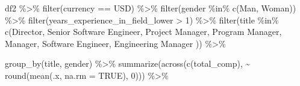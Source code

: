\documentclass[
]{article}
\newenvironment{Shaded}{\begin{snugshade}}{\end{snugshade}}
\newcommand{\AttributeTok}[1]{\textcolor[rgb]{0.77,0.63,0.00}{#1}}
\newcommand{\ConstantTok}[1]{\textcolor[rgb]{0.00,0.00,0.00}{#1}}
\newcommand{\DecValTok}[1]{\textcolor[rgb]{0.00,0.00,0.81}{#1}}
\newcommand{\FunctionTok}[1]{\textcolor[rgb]{0.00,0.00,0.00}{#1}}
\newcommand{\NormalTok}[1]{#1}
\newcommand{\SpecialCharTok}[1]{\textcolor[rgb]{0.00,0.00,0.00}{#1}}
\newcommand{\StringTok}[1]{\textcolor[rgb]{0.31,0.60,0.02}{#1}}
\begin{document}
\begin{Shaded}
\begin{Highlighting}[]
\NormalTok{df2 }\SpecialCharTok{\%\textgreater{}\%}
    \FunctionTok{filter}\NormalTok{(currency }\SpecialCharTok{==} \StringTok{\textquotesingle{}USD\textquotesingle{}}\NormalTok{) }\SpecialCharTok{\%\textgreater{}\%}
    \FunctionTok{filter}\NormalTok{(gender }\SpecialCharTok{\%in\%} \FunctionTok{c}\NormalTok{(}\StringTok{\textquotesingle{}Man\textquotesingle{}}\NormalTok{, }\StringTok{\textquotesingle{}Woman\textquotesingle{}}\NormalTok{)) }\SpecialCharTok{\%\textgreater{}\%}
    \FunctionTok{filter}\NormalTok{(years\_experience\_in\_field\_lower }\SpecialCharTok{\textgreater{}} \DecValTok{1}\NormalTok{) }\SpecialCharTok{\%\textgreater{}\%}
    \FunctionTok{filter}\NormalTok{(title }\SpecialCharTok{\%in\%} \FunctionTok{c}\NormalTok{(}\StringTok{\textquotesingle{}Director\textquotesingle{}}\NormalTok{,}
                        \StringTok{\textquotesingle{}Senior Software Engineer\textquotesingle{}}\NormalTok{,}
                        \StringTok{\textquotesingle{}Project Manager\textquotesingle{}}\NormalTok{,}
                        \StringTok{\textquotesingle{}Program Manager\textquotesingle{}}\NormalTok{,}
                        \StringTok{\textquotesingle{}Manager\textquotesingle{}}\NormalTok{,}
                        \StringTok{\textquotesingle{}Software Engineer\textquotesingle{}}\NormalTok{,}
                        \StringTok{\textquotesingle{}Engineering Manager\textquotesingle{}}
\NormalTok{                        )) }\SpecialCharTok{\%\textgreater{}\%}

    \FunctionTok{group\_by}\NormalTok{(title, gender) }\SpecialCharTok{\%\textgreater{}\%}
    \FunctionTok{summarize}\NormalTok{(}\FunctionTok{across}\NormalTok{(}\FunctionTok{c}\NormalTok{(total\_comp), }\SpecialCharTok{\textasciitilde{}} \FunctionTok{round}\NormalTok{(}\FunctionTok{mean}\NormalTok{(.x, }\AttributeTok{na.rm =} \ConstantTok{TRUE}\NormalTok{), }\DecValTok{0}\NormalTok{))) }\SpecialCharTok{\%\textgreater{}\%}
    

\end{Highlighting}
\end{Shaded}
\end{document}

